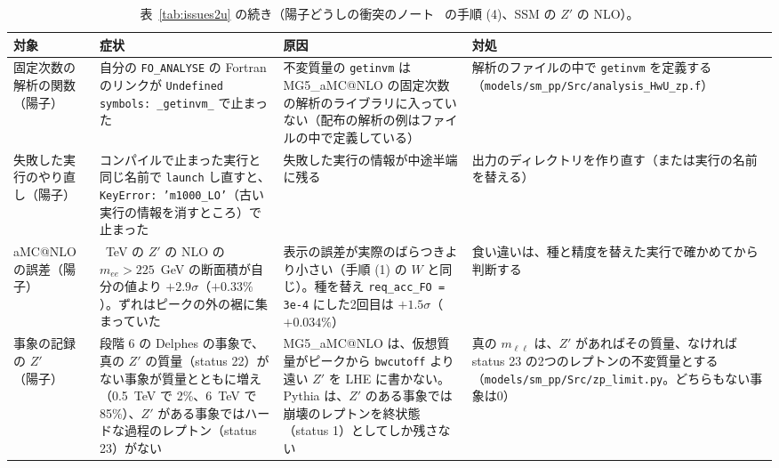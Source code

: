 \documentclass[a4paper,10pt]{ltjsarticle}
\makeatletter
\newcommand{\MGaMC}{MG5\_aMC@NLO}
\makeatother
\begin{document}
\begin{table}[tbp]
\centering\footnotesize
\caption{表~\ref{tab:issues2u} の続き（陽子どうしの衝突のノート~\cite{ppnote} の手順 (4)、SSM の $Z'$ の NLO）。}
\label{tab:issues2v}
\begin{tabularx}{\linewidth}{>{\raggedright\arraybackslash}p{2.4cm}>{\raggedright\arraybackslash}X>{\raggedright\arraybackslash}X>{\raggedright\arraybackslash}X}
\toprule
\textbf{対象} & \textbf{症状} & \textbf{原因} & \textbf{対処} \\
\midrule
固定次数の解析の関数（陽子） & 自分の \texttt{FO\_ANALYSE} の Fortran のリンクが \texttt{Undefined symbols: \_getinvm\_} で止まった & 不変質量の \texttt{getinvm} は \MGaMC{} の固定次数の解析のライブラリに入っていない（配布の解析の例はファイルの中で定義している） & 解析のファイルの中で \texttt{getinvm} を定義する（\nolinkurl{models/sm_pp/Src/analysis_HwU_zp.f}） \\
失敗した実行のやり直し（陽子） & コンパイルで止まった実行と同じ名前で \texttt{launch} し直すと、\texttt{KeyError: 'm1000\_LO'}（古い実行の情報を消すところ）で止まった & 失敗した実行の情報が中途半端に残る & 出力のディレクトリを作り直す（または実行の名前を替える） \\
aMC@NLO の誤差（陽子） & 3~TeV の $Z'$ の NLO の $m_{ee}>225$~GeV の断面積が自分の値より $+2.9\sigma$（$+0.33\%$）。ずれはピークの外の裾に集まっていた & 表示の誤差が実際のばらつきより小さい（手順 (1) の $W$ と同じ）。種を替え \texttt{req\_acc\_FO = 3e-4} にした2回目は $+1.5\sigma$（$+0.034\%$） & 食い違いは、種と精度を替えた実行で確かめてから判断する \\
事象の記録の $Z'$（陽子） & 段階 6 の Delphes の事象で、真の $Z'$ の質量（status 22）がない事象が質量とともに増え（0.5~TeV で 2\%、6~TeV で 85\%）、$Z'$ がある事象ではハードな過程のレプトン（status 23）がない & \MGaMC{} は、仮想質量がピークから \texttt{bwcutoff} より遠い $Z'$ を LHE に書かない。Pythia は、$Z'$ のある事象では崩壊のレプトンを終状態（status 1）としてしか残さない & 真の $m_{\ell\ell}$ は、$Z'$ があればその質量、なければ status 23 の2つのレプトンの不変質量とする（\nolinkurl{models/sm_pp/Src/zp_limit.py}。どちらもない事象は0） \\
\bottomrule
\end{tabularx}
\end{table}
\end{document}
